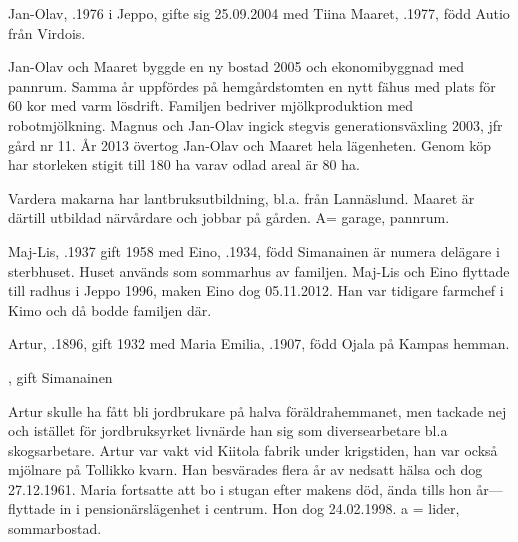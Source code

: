 


Jan-Olav, .1976 i Jeppo, gifte sig 25.09.2004 med Tiina Maaret, .1977, född Autio från Virdois.
\begin{jhchildren}
  \item {}
  \item {}
  \item {}
  \item {}
  \item {}
\end{jhchildren}

Jan-Olav och Maaret byggde en ny bostad 2005 och ekonomibyggnad med pannrum. Samma år uppfördes på hemgårdstomten en nytt fähus med plats för 60 kor med varm lösdrift. Familjen bedriver mjölkproduktion med robotmjölkning. Magnus och Jan-Olav ingick stegvis generationsväxling 2003, jfr gård nr 11. År 2013 övertog Jan-Olav och Maaret hela lägenheten. Genom köp har storleken stigit till 180 ha varav odlad areal är 80 ha.

Vardera makarna har lantbruksutbildning, bl.a. från Lannäslund. Maaret är därtill utbildad närvårdare och jobbar på gården. A= garage, pannrum.






Maj-Lis, .1937 gift 1958 med Eino, .1934, född Simanainen är numera delägare i sterbhuset.  Huset används som sommarhus av familjen. Maj-Lis och Eino flyttade till radhus i Jeppo 1996, maken Eino dog 05.11.2012. Han var tidigare farmchef i Kimo och då bodde familjen där.\jhvspace{}


Artur, .1896, gift 1932 med Maria Emilia, .1907, född Ojala på Kampas hemman.
\begin{jhchildren}
  \item {}
  \item {}, gift Simanainen
\end{jhchildren}
Artur skulle ha fått bli jordbrukare på halva föräldrahemmanet, men tackade nej och istället för jordbruksyrket livnärde han sig som diversearbetare bl.a skogsarbetare. Artur var vakt vid Kiitola fabrik under krigstiden, han var också mjölnare på Tollikko kvarn. Han besvärades flera år av nedsatt hälsa och dog 27.12.1961. Maria fortsatte att bo i stugan efter makens död, ända tills hon år---flyttade in i pensionärslägenhet i centrum. Hon dog 24.02.1998. a = lider, 	sommarbostad.


